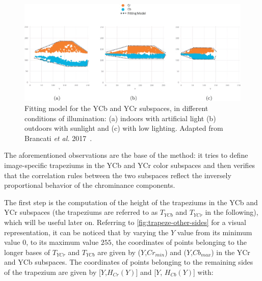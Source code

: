 \begin{figure}[h]
    \centering
    \includegraphics[width=0.9\linewidth]{images/approaches/thresholding/trapezia_illuminations.png}
    \caption{Fitting model for the YCb and YCr subspaces, in different conditions of illumination: (a) indoors with artificial light (b) outdoors with sunlight and (c) with low lighting.
    Adapted from Brancati \textit{et al.} 2017~\cite{brancati2017human}.}
    \label{fig:trapeze-illuminations}
\end{figure}

The aforementioned observations are the base of the method: it tries to define image-specific trapeziums in the YCb and YCr color subspaces and then verifies that the correlation rules between the two subspaces reflect the inversely proportional behavior of the chrominance components.

The first step is the computation of the height of the trapeziums in the YCb and YCr subspaces (the trapeziums are referred to as $T_{YCb}$ and $T_{YCr}$ in the following), which will be useful later on.
Referring to \autoref{fig:trapeze-other-sides} for a visual representation, it can be noticed that by varying the $Y$ value from its minimum value $0$, to its maximum value $255$, the coordinates of points belonging to the longer bases of $T_{YCr}$ and $T_{YCb}$ are given by ($Y$,$Cr_{min}$) and ($Y$,$Cb_{max}$) in the YCr and YCb subspaces.
The coordinates of points belonging to the remaining sides of the trapezium are given by [$Y$,$H_{Cr}(Y)$] and [$Y$, $H_{Cb}(Y)$] with:

